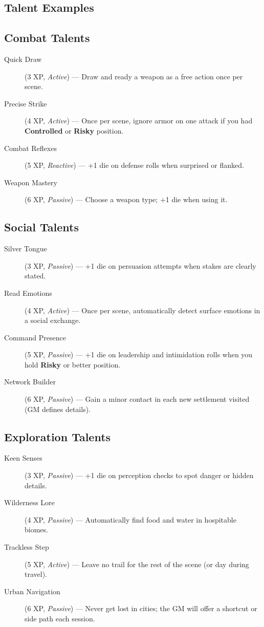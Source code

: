\begin{multicols}{2}
\section{Talent Examples}

\subsection*{Combat Talents}
\begin{description}
\item[Quick Draw] (3 XP, \emph{Active}) --- Draw and ready a weapon as a free action once per scene.
\item[Precise Strike] (4 XP, \emph{Active}) --- Once per scene, ignore armor on one attack if you had \textbf{Controlled} or \textbf{Risky} position.
\item[Combat Reflexes] (5 XP, \emph{Reactive}) --- +1 die on defense rolls when surprised or flanked.
\item[Weapon Mastery] (6 XP, \emph{Passive}) --- Choose a weapon type; +1 die when using it.
\end{description}

\subsection*{Social Talents}
\begin{description}
\item[Silver Tongue] (3 XP, \emph{Passive}) --- +1 die on persuasion attempts when stakes are clearly stated.
\item[Read Emotions] (4 XP, \emph{Active}) --- Once per scene, automatically detect surface emotions in a social exchange.
\item[Command Presence] (5 XP, \emph{Passive}) --- +1 die on leadership and intimidation rolls when you hold \textbf{Risky} or better position.
\item[Network Builder] (6 XP, \emph{Passive}) --- Gain a minor contact in each new settlement visited (GM defines details).
\end{description}

\subsection*{Exploration Talents}
\begin{description}
\item[Keen Senses] (3 XP, \emph{Passive}) --- +1 die on perception checks to spot danger or hidden details.
\item[Wilderness Lore] (4 XP, \emph{Passive}) --- Automatically find food and water in hospitable biomes.
\item[Trackless Step] (5 XP, \emph{Active}) --- Leave no trail for the rest of the scene (or day during travel).
\item[Urban Navigation] (6 XP, \emph{Passive}) --- Never get lost in cities; the GM will offer a shortcut or side path each session.
\end{description}


\end{multicols}
